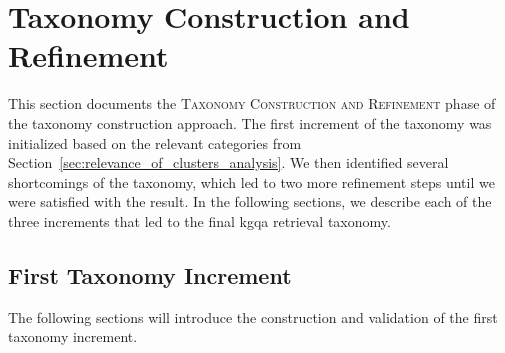 
\section{Taxonomy Construction and Refinement}
\label{sec:taxonomy_design_construction}

This section documents the \textsc{Taxonomy Construction and Refinement} phase of the taxonomy construction approach. The first increment of the taxonomy was initialized based on the relevant categories from Section~\ref{sec:relevance_of_clusters_analysis}. We then identified several shortcomings of the taxonomy, which led to two more refinement steps until we were satisfied with the result. In the following sections, we describe each of the three increments that led to the final \gls{kgqa} retrieval taxonomy.

\subsection{First Taxonomy Increment}

The following sections will introduce the construction and validation of the first taxonomy increment.

